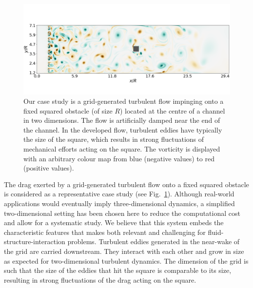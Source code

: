 \documentclass{jfm}
\newcommand{\EL}[1]{{\color{myred}{#1}}}
\begin{document}
\begin{figure}
	\centering
	\includegraphics[width=\linewidth]{illustr_ecoulement/illustr_ecoulement}
	\caption{Our case study is a grid-generated turbulent flow impinging onto a fixed squared obstacle (of size $R$) located at the centre of a channel in two dimensions. The flow is artificially damped near the end of the channel. In the developed flow, turbulent eddies have typically the size of the square, which results in strong fluctuations of mechanical efforts acting on the square. The vorticity is displayed with an arbitrary colour map from blue (negative values) to red (positive values).}
	\label{fig:illustr_ecoulement}
\end{figure}

%
The drag exerted by a grid-generated turbulent flow onto a fixed squared obstacle is considered as a representative case study (see Fig.~\ref{fig:illustr_ecoulement}). 
%
Although real-world applications would eventually imply three-dimensional dynamics, a simplified two-dimensional setting has been chosen here to reduce the computational cost and allow for a systematic study. 
% 
We believe that this system embeds the characteristic features that makes 
 \EL{this study} both relevant and challenging for fluid-structure-interaction problems. 
%
Turbulent eddies generated in the near-wake of the grid are carried downstream.
They interact with each other and grow in size as expected for two-dimensional turbulent dynamics. 
The dimension of the grid is such that the size of the eddies that hit the square is comparable to its size, resulting in strong fluctuations of the drag acting on the square. 
%
%
%
\end{document}
